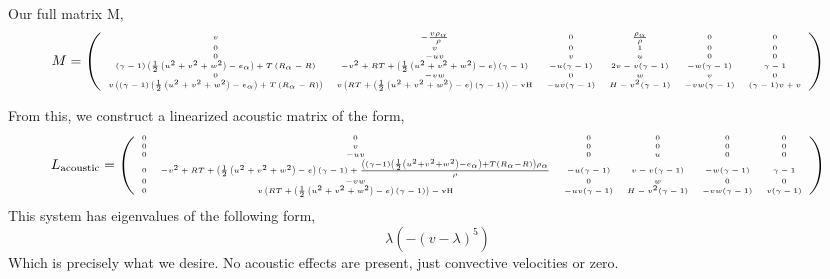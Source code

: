 Our full matrix M,
\begin{equation}
\tiny
M = 
\left(
\begin{array}{cccccc}
 v & -\frac{v \rho _{\alpha }}{\rho } & 0 & \frac{\rho _{\alpha }}{\rho } & 0 & 0 \\
 0 & v & 0 & 1 & 0 & 0 \\
 0 & -u v & v & u & 0 & 0 \\
 (\gamma -1) \left(\frac{1}{2} \left(u^2+v^2+w^2\right)-e_{\alpha }\right)+T \left(R_{\alpha }-R\right) & -v^2+R T+\left(\frac{1}{2} \left(u^2+v^2+w^2\right)-e\right) (\gamma
   -1) & -u (\gamma -1) & 2 v-v (\gamma -1) & -w (\gamma -1) & \gamma -1 \\
 0 & -v w & 0 & w & v & 0 \\
 v \left((\gamma -1) \left(\frac{1}{2} \left(u^2+v^2+w^2\right)-e_{\alpha }\right)+T \left(R_{\alpha }-R\right)\right) & v \left(R T+\left(\frac{1}{2}
   \left(u^2+v^2+w^2\right)-e\right) (\gamma -1)\right)-\text{vH} & -u v (\gamma -1) & H-v^2 (\gamma -1) & -v w (\gamma -1) & (\gamma -1) v+v
\end{array}
\right)
\end{equation}

From this, we construct a linearized acoustic matrix of the form,
\begin{equation}
\tiny
L_{\text{acoustic}} = 
\left(
\begin{array}{cccccc}
 0 & 0 & 0 & 0 & 0 & 0 \\
 0 & v & 0 & 0 & 0 & 0 \\
 0 & -u v & 0 & u & 0 & 0 \\
 0 & -v^2+R T+\left(\frac{1}{2} \left(u^2+v^2+w^2\right)-e\right) (\gamma -1)+\frac{\left((\gamma -1) \left(\frac{1}{2} \left(u^2+v^2+w^2\right)-e_{\alpha }\right)+T
   \left(R_{\alpha }-R\right)\right) \rho _{\alpha }}{\rho } & -u (\gamma -1) & v-v (\gamma -1) & -w (\gamma -1) & \gamma -1 \\
 0 & -v w & 0 & w & 0 & 0 \\
 0 & v \left(R T+\left(\frac{1}{2} \left(u^2+v^2+w^2\right)-e\right) (\gamma -1)\right)-\text{vH} & -u v (\gamma -1) & H-v^2 (\gamma -1) & -v w (\gamma -1) & v (\gamma -1)
\end{array}
\right)
\end{equation}
This system has eigenvalues of the following form,
\begin{equation}
 \lambda  \left(-(v-\lambda )^5\right)
\end{equation}
Which is precisely what we desire. No acoustic effects are present, just
convective velocities or zero.

